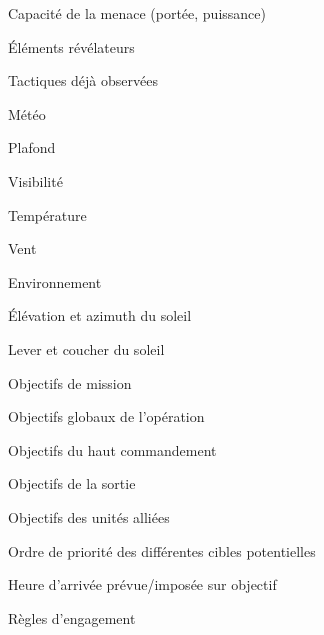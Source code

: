             \item Capacité de la menace (portée, puissance)
            \item Éléments révélateurs
            \item Tactiques déjà observées
        \ed
    \ed
    \item Météo
    \ee
        \item Plafond
        \item Visibilité
        \item Température
        \item Vent
    \ed
    \item Environnement
    \ee
        \item Élévation et azimuth du soleil
        \item Lever et coucher du soleil
    \ed
    \item Objectifs de mission
    \ee
        \item Objectifs globaux de l’opération
        \item Objectifs du haut commandement
        \item Objectifs de la sortie
        \item Objectifs des unités alliées
        \item Ordre de priorité des différentes cibles potentielles
        \item Heure d’arrivée prévue/imposée sur objectif
        \item Règles d’engagement
    \ed
\ed





